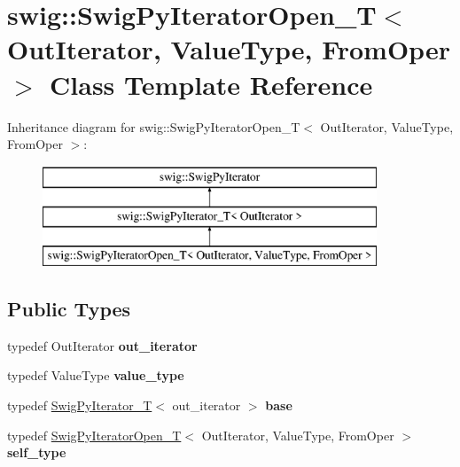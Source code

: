 \hypertarget{classswig_1_1_swig_py_iterator_open___t}{}\section{swig\+:\+:Swig\+Py\+Iterator\+Open\+\_\+T$<$ Out\+Iterator, Value\+Type, From\+Oper $>$ Class Template Reference}
\label{classswig_1_1_swig_py_iterator_open___t}
Inheritance diagram for swig\+:\+:Swig\+Py\+Iterator\+Open\+\_\+T$<$ Out\+Iterator, Value\+Type, From\+Oper $>$\+:\begin{figure}[H]
\begin{center}
\leavevmode
\includegraphics[height=3.000000cm]{classswig_1_1_swig_py_iterator_open___t}
\end{center}
\end{figure}
\subsection*{Public Types}
\begin{DoxyCompactItemize}
\item 
\mbox{\label{classswig_1_1_swig_py_iterator_open___t_ad348022c40678f2217e0696c8b6bb59b}} 
typedef Out\+Iterator {\bfseries out\+\_\+iterator}
\item 
\mbox{\label{classswig_1_1_swig_py_iterator_open___t_ac5d08f0ecc1d014a83632411678103f3}} 
typedef Value\+Type {\bfseries value\+\_\+type}
\item 
\mbox{\label{classswig_1_1_swig_py_iterator_open___t_acee28cc32d3d9a19f711bd9df933b06c}} 
typedef \hyperlink{classswig_1_1_swig_py_iterator___t}{Swig\+Py\+Iterator\+\_\+T}$<$ out\+\_\+iterator $>$ {\bfseries base}
\item 
\mbox{\label{classswig_1_1_swig_py_iterator_open___t_a232561380f04d1a22f772e24d6ff38e5}} 
typedef \hyperlink{classswig_1_1_swig_py_iterator_open___t}{Swig\+Py\+Iterator\+Open\+\_\+T}$<$ Out\+Iterator, Value\+Type, From\+Oper $>$ {\bfseries self\+\_\+type}
\end{DoxyCompactItemize}
